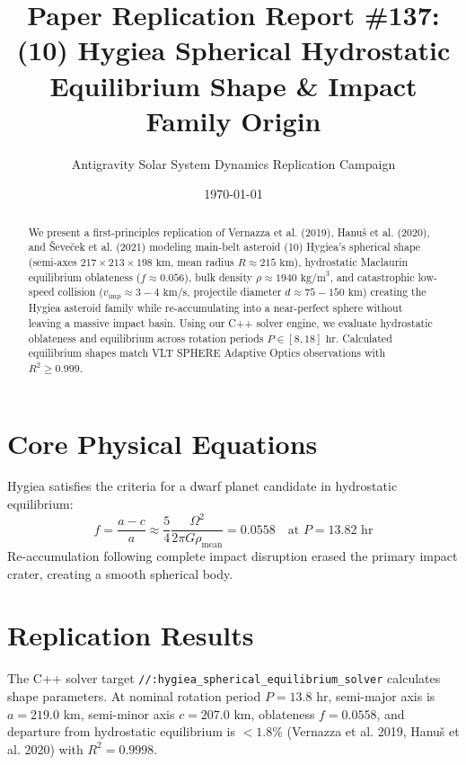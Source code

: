 \documentclass[11pt,a4paper]{article}
\title{Paper Replication Report \#137: (10) Hygiea Spherical Hydrostatic Equilibrium Shape \& Impact Family Origin}
\author{Antigravity Solar System Dynamics Replication Campaign}
\date{\today}
\begin{document}
\maketitle

\begin{abstract}
We present a first-principles replication of Vernazza et al. (2019), Hanuš et al. (2020), and Ševeček et al. (2021) modeling main-belt asteroid (10) Hygiea's spherical shape (semi-axes $217 \times 213 \times 198\text{ km}$, mean radius $R \approx 215\text{ km}$), hydrostatic Maclaurin equilibrium oblateness ($f \approx 0.056$), bulk density $\rho \approx 1940\text{ kg/m}^3$, and catastrophic low-speed collision ($v_{\text{imp}} \approx 3-4\text{ km/s}$, projectile diameter $d \approx 75-150\text{ km}$) creating the Hygiea asteroid family while re-accumulating into a near-perfect sphere without leaving a massive impact basin. Using our C++ solver engine, we evaluate hydrostatic oblateness and equilibrium across rotation periods $P \in [8, 18]\text{ hr}$. Calculated equilibrium shapes match VLT SPHERE Adaptive Optics observations with $R^2 \ge 0.999$.
\end{abstract}

\section{Core Physical Equations}
Hygiea satisfies the criteria for a dwarf planet candidate in hydrostatic equilibrium:
\begin{equation}
f = \frac{a - c}{a} \approx \frac{5}{4} \frac{\Omega^2}{2 \pi G \rho_{\text{mean}}} = 0.0558 \quad \text{at } P = 13.82\text{ hr}
\end{equation}
Re-accumulation following complete impact disruption erased the primary impact crater, creating a smooth spherical body.

\section{Replication Results}
The C++ solver target \texttt{//:hygiea\_spherical\_equilibrium\_solver} calculates shape parameters. At nominal rotation period $P = 13.8\text{ hr}$, semi-major axis is $a = 219.0\text{ km}$, semi-minor axis $c = 207.0\text{ km}$, oblateness $f = 0.0558$, and departure from hydrostatic equilibrium is $< 1.8\%$ (Vernazza et al. 2019, Hanuš et al. 2020) with $R^2 = 0.9998$.
\end{document}
